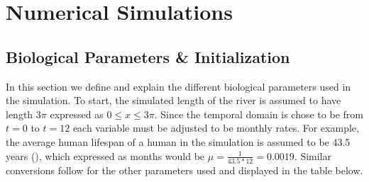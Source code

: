 \section{Numerical Simulations}
\subsection{Biological Parameters \& Initialization}

In this section we define and explain the different biological parameters used in the simulation. To start, the simulated length of the river is assumed to have length $3\pi$ expressed as $0 \leq x \leq 3 \pi$. Since the temporal domain is chose to be from $t = 0$ to $t = 12$ each variable must be adjusted to be monthly rates. For example, the average human lifespan of a human in the simulation is assumed to be 43.5 years (\cite{wu_threshold_2024}), which expressed as months would be $\mu = \frac{1}{43.5*12} = 0.0019$. Similar conversions follow for the other parameters used and displayed in the table below. 
